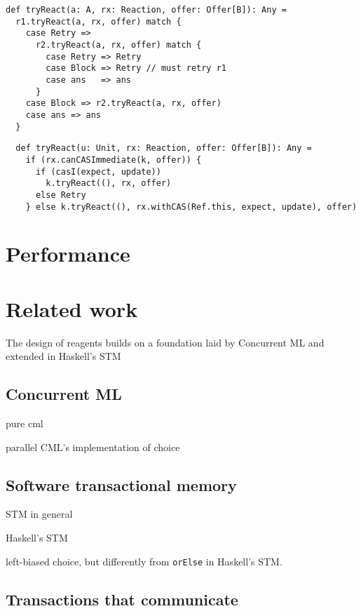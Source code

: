 \documentclass[preprint]{sigplanconf}
\begin{document}
\begin{lstlisting}
def tryReact(a: A, rx: Reaction, offer: Offer[B]): Any = 
  r1.tryReact(a, rx, offer) match {
    case Retry => 
      r2.tryReact(a, rx, offer) match {
        case Retry => Retry
        case Block => Retry // must retry r1
        case ans   => ans
      }
    case Block => r2.tryReact(a, rx, offer)
    case ans => ans
  }
\end{lstlisting}

\begin{lstlisting}
  def tryReact(u: Unit, rx: Reaction, offer: Offer[B]): Any = 
    if (rx.canCASImmediate(k, offer)) {
      if (casI(expect, update))
        k.tryReact((), rx, offer)
      else Retry
    } else k.tryReact((), rx.withCAS(Ref.this, expect, update), offer)
\end{lstlisting}

\section{Performance}
\label{sec:performance}



\section{Related work}
\label{sec:related}

The design of reagents builds on a foundation laid by Concurrent ML
and extended in Haskell's STM

\subsection{Concurrent ML}

pure cml~\cite{Reppy1991}

parallel CML's implementation of choice~\cite{Reppy2009}

\subsection{Software transactional memory}

STM in general

Haskell's STM~\cite{Harris2005a}

left-biased choice, but differently from \lstinline{orElse} in
Haskell's STM.

\subsection{Transactions that communicate}
\end{document}
